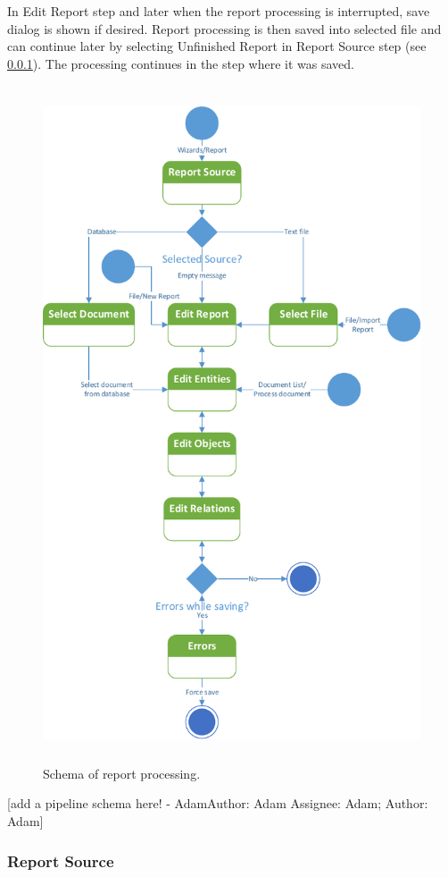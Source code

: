 \documentclass[12pt,a4paper]{report}
\makeatletter
\newcommand{\comment}[3][\@empty]{
  {\color{magenta}[#3 - }
  {\color{green}\ifx\@empty#1\relax Author: #2 \else Assignee: #1; Author: #2\fi}{\color{magenta}]}
}
\makeatother
\begin{document}
In Edit Report step and later when the report processing is interrupted, save
dialog is shown if desired. Report processing is then saved into selected file
and can continue later by selecting Unfinished Report in Report Source step (see
\ref{sssec:ReportSource}). The processing continues in the step where it was
saved.

\begin{figure}[!htb]
        \centering
        \includegraphics[height=20cm,keepaspectratio]{Images/pipeline}
        \caption{Schema of report processing.}
        \label{fig:Pipeline}
\end{figure}

\comment[Adam]{Adam}{add a pipeline schema here!}

\subsubsection{Report Source}
\label{sssec:ReportSource}
\end{document}
